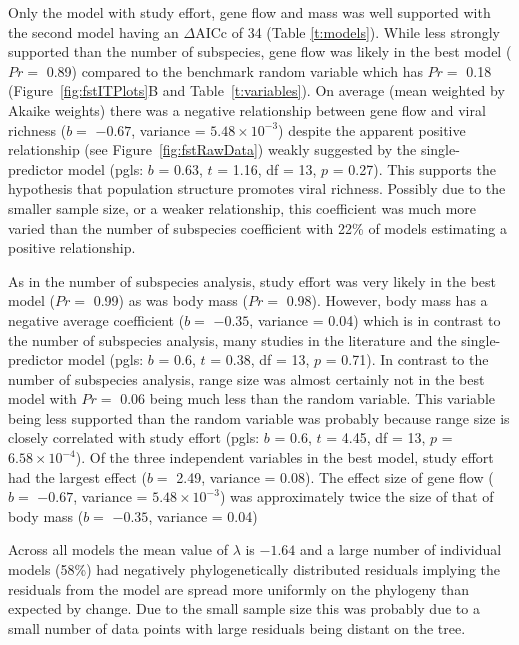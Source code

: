 
Only the model with study effort, gene flow and mass was well supported with the second model having an $\Delta\text{AICc}$ of 34 (Table \ref{t:models}).
While less strongly supported than the number of subspecies, gene flow was likely in the best model ($Pr = $ 0.89) compared to the benchmark random variable which has $Pr = $ 0.18 (Figure~\ref{fig:fstITPlots}B and Table~\ref{t:variables}).
On average (mean weighted by Akaike weights) there was a negative relationship between gene flow and viral richness ($b = $ \ensuremath{-0.67}, variance = \ensuremath{5.48\times 10^{-3}}) despite the apparent positive relationship (see Figure~\ref{fig:fstRawData}) weakly suggested by the single-predictor model (pgls: $b$ = 0.63, $t$ = 1.16, df = 13, $p$ = 0.27).
This supports the hypothesis that population structure promotes viral richness.
Possibly due to the smaller sample size, or a weaker relationship, this coefficient was much more varied than the number of subspecies coefficient with 22\% of models estimating a positive relationship.

As in the number of subspecies analysis, study effort was very likely in the best model ($Pr = $ 0.99) as was body mass ($Pr = $ 0.98).
However, body mass has a negative average coefficient ($b = $ \ensuremath{-0.35}, variance = 0.04) which is in contrast to the number of subspecies analysis, many studies in the literature \cite{kamiya2014determines, turmelle2009correlates, gay2014parasite, maganga2014bat} and the single-predictor model (pgls: $b$ = 0.6, $t$ = 0.38, df = 13, $p$ = 0.71).
In contrast to the number of subspecies analysis, range size was almost certainly not in the best model with $Pr = $ 0.06 being much less than the random variable.
This variable being less supported than the random variable was probably because range size is closely correlated with study effort (pgls: $b$ = 0.6, $t$ = 4.45, df = 13, $p$ = \ensuremath{6.58\times 10^{-4}}).
Of the three independent variables in the best model, study effort had the largest effect ($b = $ 2.49, variance = 0.08).
The effect size of gene flow ($b = $ \ensuremath{-0.67}, variance = \ensuremath{5.48\times 10^{-3}}) was approximately twice the size of that of body mass ($b = $ \ensuremath{-0.35}, variance = 0.04)

Across all models the mean value of $\lambda$ is \ensuremath{-1.64} and a large number of individual models (58\%)  had negatively phylogenetically distributed residuals implying the residuals from the model are spread more uniformly on the phylogeny than expected by change.
Due to the small sample size this was probably due to a small number of data points with large residuals being distant on the tree.






